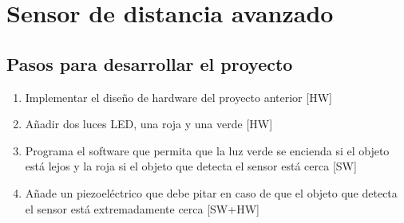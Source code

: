 \documentclass[11pt,spanish,a4paper]{article}
\begin{document}
\section{Sensor de distancia avanzado}

\subsection{Pasos para desarrollar el proyecto}
\begin{enumerate}
	\item Implementar el diseño de hardware del proyecto anterior [HW]
	\item Añadir dos luces LED, una roja y una verde [HW]
	\item Programa el software que permita que la luz verde se encienda si el objeto está lejos y la
		roja si el objeto que detecta el sensor está cerca [SW]
    \item Añade un piezoeléctrico que debe pitar en caso de que el objeto que detecta el sensor está
		extremadamente cerca [SW+HW]
\end{enumerate}

\end{document}
